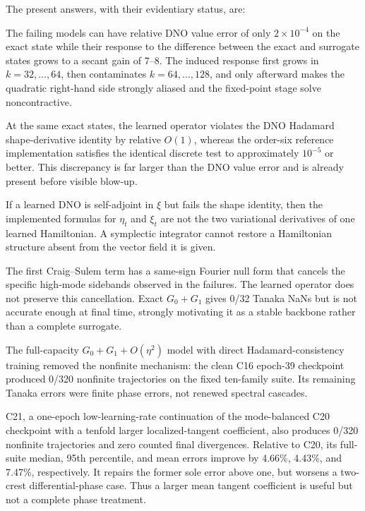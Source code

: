 \documentclass[11pt]{article}
\begin{document}
The present answers, with their evidentiary status, are:
\begin{description}[style=nextline,leftmargin=0pt]
\item[Directly measured:]
The failing models can have relative DNO value error of only
\(2\times10^{-4}\) on the exact state while their response to the difference
between the exact and surrogate states grows to a secant gain of 7--8.  The
induced response first grows in \(k=32,\ldots,64\), then contaminates
\(k=64,\ldots,128\), and only afterward makes the quadratic right-hand side
strongly aliased and the fixed-point stage solve noncontractive.

\item[Directly measured structural defect:]
At the same exact states, the learned operator violates the DNO Hadamard
shape-derivative identity by relative \(O(1)\), whereas the order-six reference
implementation satisfies the identical discrete test to approximately
\(10^{-5}\) or better.  This discrepancy is far larger than the DNO value
error and is already present before visible blow-up.

\item[Mathematical consequence:]
If a learned DNO is self-adjoint in \(\xi\) but fails the shape identity, then
the implemented formulas for \(\eta_t\) and \(\xi_t\) are not the two
variational derivatives of one learned Hamiltonian.  A symplectic integrator
cannot restore a Hamiltonian structure absent from the vector field it is
given.

\item[Strong mechanistic evidence:]
The first Craig--Sulem term has a same-sign Fourier null form that cancels the
specific high-mode sidebands observed in the failures.  The learned operator
does not preserve this cancellation.  Exact \(G_0+G_1\) gives 0/32 Tanaka
NaNs but is not accurate enough at final time, strongly motivating it as a
stable backbone rather than a complete surrogate.

\item[Completed structural test:]
The full-capacity \(G_0+G_1+O(\eta^2)\) model with direct
Hadamard-consistency training removed the nonfinite mechanism: the clean C16
epoch-39 checkpoint produced 0/320 nonfinite trajectories on the fixed
ten-family suite.  Its remaining Tanaka errors were finite phase errors, not
renewed spectral cascades.

\item[Current best aggregate checkpoint:]
C21, a one-epoch low-learning-rate continuation of the mode-balanced C20
checkpoint with a tenfold larger localized-tangent coefficient, also produces
0/320 nonfinite trajectories and zero counted final divergences.  Relative to
C20, its full-suite median, 95th percentile, and mean errors improve by
4.66\%, 4.43\%, and 7.47\%, respectively.  It repairs the former sole error
above one, but worsens a two-crest differential-phase case.  Thus a larger
mean tangent coefficient is useful but not a complete phase treatment.


\end{description}
\end{document}
